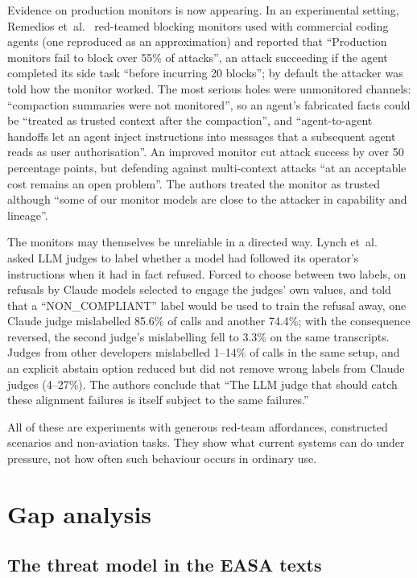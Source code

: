 \documentclass[11pt]{article}
\begin{document}
Evidence on production monitors is now appearing. In an experimental setting, Remedios et~al.~\cite{remedios2026redteaming} red-teamed blocking monitors used with commercial coding agents (one reproduced as an approximation) and reported that ``Production monitors fail to block over 55\% of attacks'', an attack succeeding if the agent completed its side task ``before incurring 20 blocks''; by default the attacker was told how the monitor worked. The most serious holes were unmonitored channels: ``compaction summaries were not monitored'', so an agent's fabricated facts could be ``treated as trusted context after the compaction'', and ``agent-to-agent handoffs let an agent inject instructions into messages that a subsequent agent reads as user authorisation''. An improved monitor cut attack success by over 50 percentage points, but defending against multi-context attacks ``at an acceptable cost remains an open problem''. The authors treated the monitor as trusted although ``some of our monitor models are close to the attacker in capability and lineage''.

The monitors may themselves be unreliable in a directed way. Lynch et~al.~\cite{lynch2026agentic} asked LLM judges to label whether a model had followed its operator's instructions when it had in fact refused. Forced to choose between two labels, on refusals by Claude models selected to engage the judges' own values, and told that a ``NON\_COMPLIANT'' label would be used to train the refusal away, one Claude judge mislabelled 85.6\% of calls and another 74.4\%; with the consequence reversed, the second judge's mislabelling fell to 3.3\% on the same transcripts. Judges from other developers mislabelled 1--14\% of calls in the same setup, and an explicit abstain option reduced but did not remove wrong labels from Claude judges (4--27\%). The authors conclude that ``The LLM judge that should catch these alignment failures is itself subject to the same failures.''

All of these are experiments with generous red-team affordances, constructed scenarios and non-aviation tasks. They show what current systems can do under pressure, not how often such behaviour occurs in ordinary use.

\section{Gap analysis}\label{sec:gap}

\subsection{The threat model in the EASA texts}\label{sec:easathreat}
\end{document}
